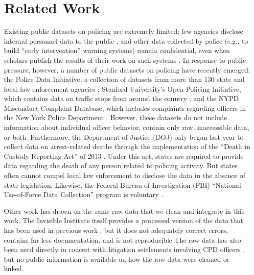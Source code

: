 \section{Related Work}\label{sec:related}
Existing public datasets on policing are extremely limited; 
few agencies disclose internal personnel data to the public \cite{Jackman21},
and other data collected by police (e.g., to build ``early intervention'' warning systems)
remain confidential, even when scholars publish the results of their 
work on such systems \cite{Helsby18}.
In response to public pressure, however, a number of
public datasets on policing have recently emerged: 
the Police Data Initiative, a collection of datasets from 
more than 130 state and local law enforcement agencies \cite{pdi};
Stanford University’s Open Policing Initiative, which contains
data on traffic stops from around the country \cite{sopp}; and
the NYPD Misconduct Complaint Database,
which includes complaints regarding officers in the New York Police Department \cite{nmcd}.
However, these datasets do not include information about individual officer behavior,
contain only raw, inaccessible data, or both.
Furthermore, the Department of Justice
(DOJ) only began last year to collect data on arrest-related deaths through the
implementation of the ``Death in Custody Reporting Act'' of 2013
\cite{DICRA2013}. Under this act, states are required to provide data regarding
the death of any person related to policing activity. But states often cannot compel local
law enforcement to disclose the data in the absence of state legislation.
Likewise, the Federal Bureau of Investigation (FBI) ``National Use-of-Force
Data Collection'' program is voluntary \cite{Gardner2020}.

Other work has drawn on the same raw data that we clean and integrate in this
work.  The Invisible Institute itself provides a processed version of the data
that has been used in previous work \cite{invisdata,ba2021role}, but it does
not adequately correct errors, contains far less documentation, and is not
reproducible  The raw data has also been used directly in concert with litigation
settlements involving CPD officers \cite{Rozema19}, but no public information
is available on how the raw data were cleaned or linked.
